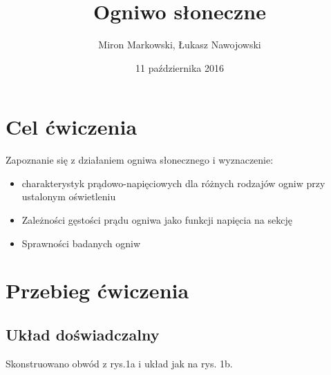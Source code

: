 \documentclass[12pt,a4paper]{article}
\begin{document}
\title{Ogniwo słoneczne}
\date{11 października 2016}
\author{Miron Markowski, Łukasz Nawojowski}
\maketitle

\section{Cel ćwiczenia}

Zapoznanie się z działaniem ogniwa słonecznego i wyznaczenie:

\begin{itemize}
\item charakterystyk prądowo-napięciowych dla różnych rodzajów ogniw
przy ustalonym oświetleniu
\item Zależności gęstości prądu ogniwa jako funkcji napięcia na sekcję
\item Sprawności badanych ogniw
\end{itemize}



\section{Przebieg ćwiczenia}

\subsection{Układ doświadczalny}
Skonstruowano obwód z rys.1a i układ jak na rys. 1b.
\end{document}
